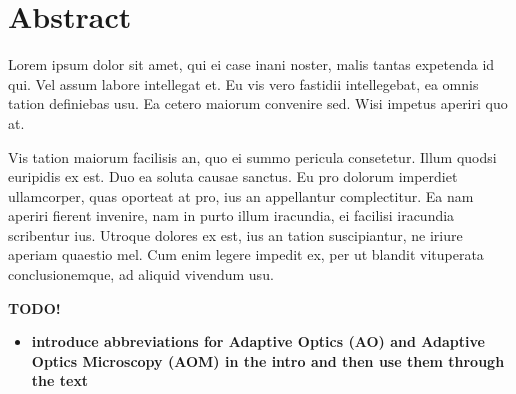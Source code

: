 \section*{Abstract}

Lorem ipsum dolor sit amet, qui ei case inani noster, malis tantas expetenda id qui. Vel assum labore intellegat et. Eu vis vero fastidii intellegebat, ea omnis tation definiebas usu. Ea cetero maiorum convenire sed. Wisi impetus aperiri quo at.

Vis tation maiorum facilisis an, quo ei summo pericula consetetur. Illum quodsi euripidis ex est. Duo ea soluta causae sanctus. Eu pro dolorum imperdiet ullamcorper, quas oporteat at pro, ius an appellantur complectitur. Ea nam aperiri fierent invenire, nam in purto illum iracundia, ei facilisi iracundia scribentur ius. Utroque dolores ex est, ius an tation suscipiantur, ne iriure aperiam quaestio mel. Cum enim legere impedit ex, per ut blandit vituperata conclusionemque, ad aliquid vivendum usu.
\newline

\textbf{TODO!}

\begin{itemize}
	\item \textbf{introduce abbreviations for Adaptive Optics (AO) and Adaptive Optics Microscopy (AOM) in the intro and then use them through the text }
\end{itemize}
